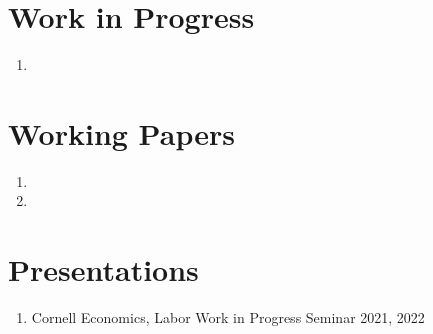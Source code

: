 \documentclass[letterpaper,11pt,oneside]{article}
\begin{document}
\section*{Work in Progress}
\begin{enumerate}[itemsep=2.5pt, label={}]
    \item {}
\end{enumerate}


\section*{Working Papers}
\begin{enumerate}[itemsep=2.5pt, label={}]
    \item {}
    \item {}
\end{enumerate}


 
\section*{Presentations}
\begin{enumerate}[noitemsep, label={}]
    \item Cornell Economics, Labor Work in Progress Seminar 2021, 2022
\end{enumerate}

\end{document}
